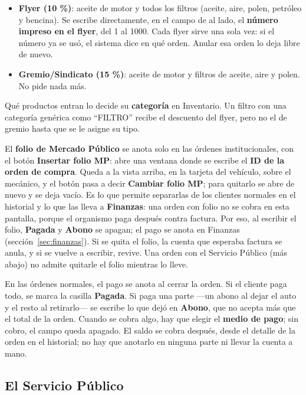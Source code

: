 \documentclass[11pt,a4paper]{article}
\begin{document}
\begin{itemize}
  \item \textbf{Flyer (10 \%)}: aceite de motor y todos los filtros (aceite,
        aire, polen, petróleo y bencina). Se escribe directamente, en el campo
        de al lado, el \textbf{número impreso en el flyer}, del 1 al 1000. Cada flyer sirve una sola vez: si
        el número ya se usó, el sistema dice en qué orden. Anular esa orden lo
        deja libre de nuevo.
  \item \textbf{Gremio/Sindicato (15 \%)}: aceite de motor y filtros de aceite,
        aire y polen. No pide nada más.
\end{itemize}

Qué productos entran lo decide su \textbf{categoría} en Inventario. Un filtro
con una categoría genérica como ``FILTRO'' recibe el descuento del flyer, pero
no el de gremio hasta que se le asigne su tipo.

El \textbf{folio de Mercado Público} se anota solo en las órdenes
institucionales, con el botón \textbf{Insertar folio MP}: abre una ventana donde
se escribe el \textbf{ID de la orden de compra}. Queda a la vista arriba, en la
tarjeta del vehículo, sobre el mecánico, y el botón pasa a decir \textbf{Cambiar
folio MP}; para quitarlo se abre de nuevo y se deja vacío. Es lo que permite separarlas de los clientes normales en el
historial y lo que las lleva a \textbf{Finanzas}: una orden con folio no se cobra
en esta pantalla, porque el organismo paga después contra factura. Por eso, al
escribir el folio, \textbf{Pagada} y \textbf{Abono} se apagan; el pago se anota
en Finanzas (sección~\ref{sec:finanzas}). Si se quita el folio, la cuenta que
esperaba factura se anula, y si se vuelve a escribir, revive. Una orden con el
Servicio Público (más abajo) no admite quitarle el folio mientras lo lleve.

En las órdenes normales, el pago se anota al cerrar la orden. Si el cliente paga todo, se marca la
casilla \textbf{Pagada}. Si paga una parte —un abono al dejar el auto y el resto
al retirarlo— se escribe lo que dejó en \textbf{Abono}, que no acepta más que el
total de la orden. Cuando se cobra algo, hay que elegir el \textbf{medio de pago};
sin cobro, el campo queda apagado. El saldo se cobra después, desde el detalle
de la orden en el historial; no hay que anotarlo en ninguna parte ni llevar la
cuenta a mano.

\subsection{El Servicio Público}
\end{document}
